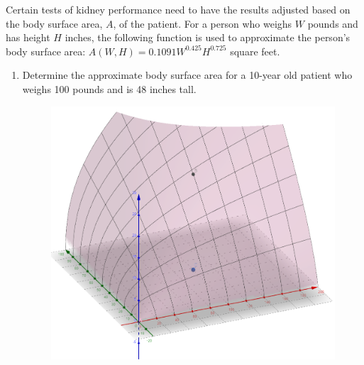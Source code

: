 \begin{example}
Certain tests of kidney performance need to have the results adjusted based on the body surface area, $A$, of the patient.  For a person who weighs $W$ pounds and has height $H$ inches, the following function is used to approximate the person’s body surface area: $A(W,H)=0.1091W^{0.425}H^{0.725}$ square feet.   
\renewcommand{\labelenumi}{\textbf{(\alph{enumi})}}
\begin{enumerate}[leftmargin=*]
    \item Determine the approximate body surface area for a 10-year old patient who weighs 100 pounds and is 48 inches tall.     
    \begin{figure}[h!]
        \flushleft
        \includegraphics[scale=0.5]{images/twoVariables/ex19_2a.png}
    \end{figure}
    

\end{enumerate}
\end{example}
